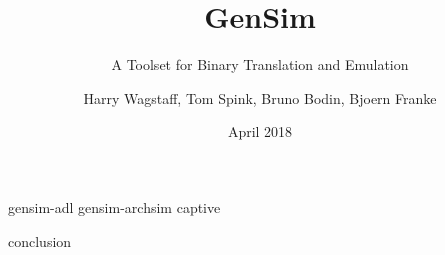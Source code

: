 \documentclass{beamer}
\title %
{GenSim}
\subtitle{A Toolset for Binary Translation and Emulation}
\author %
{Harry Wagstaff, Tom Spink, Bruno Bodin, Bjoern Franke}
\institute %
{
	Institute for Computing Systems Architecture \\
	University of Edinburgh
}
\date %
{April 2018}
\begin{document}
	
\begin{frame}
  \titlepage
\end{frame}

	
	





 {gensim-adl}
 {gensim-archsim}
 {captive}

 {conclusion}
\end{document}
